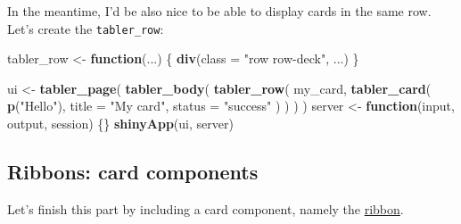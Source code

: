 \documentclass[]{book}
\newenvironment{Shaded}{\begin{snugshade}}{\end{snugshade}}
\newcommand{\ControlFlowTok}[1]{\textcolor[rgb]{0.13,0.29,0.53}{\textbf{#1}}}
\newcommand{\DataTypeTok}[1]{\textcolor[rgb]{0.13,0.29,0.53}{#1}}
\newcommand{\KeywordTok}[1]{\textcolor[rgb]{0.13,0.29,0.53}{\textbf{#1}}}
\newcommand{\NormalTok}[1]{#1}
\newcommand{\OperatorTok}[1]{\textcolor[rgb]{0.81,0.36,0.00}{\textbf{#1}}}
\newcommand{\OtherTok}[1]{\textcolor[rgb]{0.56,0.35,0.01}{#1}}
\newcommand{\StringTok}[1]{\textcolor[rgb]{0.31,0.60,0.02}{#1}}
\begin{document}
In the meantime, I'd be also nice to be able to display cards in the same row. Let's create the \texttt{tabler\_row}:

\begin{Shaded}
\begin{Highlighting}[]
\NormalTok{tabler_row <-}\StringTok{ }\ControlFlowTok{function}\NormalTok{(...) \{}
  \KeywordTok{div}\NormalTok{(}\DataTypeTok{class =} \StringTok{"row row-deck"}\NormalTok{, ...)}
\NormalTok{\}}
\end{Highlighting}
\end{Shaded}

\begin{Shaded}
\begin{Highlighting}[]
\NormalTok{ui <-}\StringTok{ }\KeywordTok{tabler_page}\NormalTok{(}
  \KeywordTok{tabler_body}\NormalTok{(}
    \KeywordTok{tabler_row}\NormalTok{(}
\NormalTok{      my_card,}
      \KeywordTok{tabler_card}\NormalTok{(}
        \KeywordTok{p}\NormalTok{(}\StringTok{"Hello"}\NormalTok{), }
        \DataTypeTok{title =} \StringTok{"My card"}\NormalTok{, }
        \DataTypeTok{status =} \StringTok{"success"}
\NormalTok{      ) }
\NormalTok{    )}
\NormalTok{  )}
\NormalTok{)}
\NormalTok{server <-}\StringTok{ }\ControlFlowTok{function}\NormalTok{(input, output, session) \{\}}
\KeywordTok{shinyApp}\NormalTok{(ui, server)}
\end{Highlighting}
\end{Shaded}

\hypertarget{ribbons-card-components}{%
\subsection{Ribbons: card components}\label{ribbons-card-components}}

Let's finish this part by including a card component, namely the \href{https://preview-dev.tabler.io/docs/ribbons.html}{ribbon}.

\begin{Shaded}
\end{Shaded}
\end{document}

